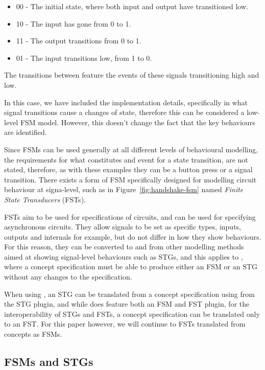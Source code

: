 \begin{itemize}

\item 00 - The initial state, where both input and output have transitioned low.

\item 10 - The input has gone from 0 to 1.

\item 11 - The output transitions from 0 to 1.

\item 01 - The input transitions low, from 1 to 0.

\end{itemize}

\noindent The transitions between feature the events of these signals transitioning high and low. 

In this case, we have included the implementation details, specifically in what signal transitions cause a changes of state, 
therefore this can be considered a low-level FSM model. However, this doesn't change the fact that the key behaviours are identified. 

Since FSMs can be used generally at all different levels of behavioural modelling, the requirements for what constitutes and event for
a state transition, are not stated, therefore, as with these examples they can be a button press or a signal transition. There exists 
a form of FSM specifically designed for modelling circuit behaviour at signa-level, such as in Figure~\ref{fig:handshake-fsm} named 
\emph{Finite State Transducers} (FSTs). 

FSTs aim to be used for specifications of circuits, and can be used for specifying asynchronous circuits. They allow signals
to be set as specific types, inputs, outputs and internals for example, but do not differ in how they show behaviours. For this reason, 
they can be converted to and from other modelling methods aimed at showing signal-level behaviours such as STGs, and this applies
to , where a concept specification must be able to produce either an FSM or an STG without any changes to the specification. 

When using , an STG can be translated from a concept specification using  from the STG plugin, and while  does
feature both an FSM and FST plugin, for the interoperability of STGs and FSTs, a concept specification can be translated only to an FST. For this paper however, 
we will continue to FSTs translated from concepts as FSMs. 

\subsection{FSMs and STGs \label{sub:FSMs-STGs}}